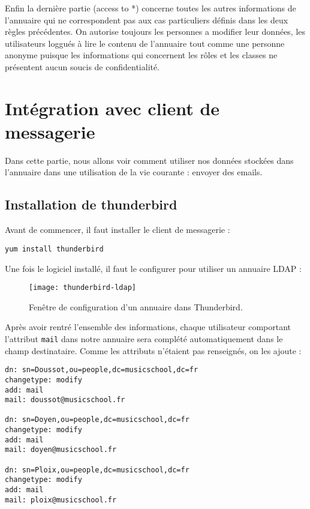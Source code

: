 \documentclass[12pt,a4paper,notitlepage]{article}
\begin{document}
Enfin la dernière partie (access to *) concerne toutes les autres informations de l'annuaire qui ne correspondent pas aux cas particuliers définis dans les deux règles précédentes. On autorise toujours les personnes a modifier leur données, les utilisateurs loggués à lire le contenu de l'annuaire tout comme une personne anonyme puisque les informations qui concernent les rôles et les classes ne présentent aucun soucis de confidentialité.





\clearpage
\section{Intégration avec client de messagerie}

Dans cette partie, nous allons voir comment utiliser nos données stockées dans l'annuaire dans une utilisation de la vie courante : envoyer des emails.
\subsection{Installation de thunderbird}

Avant de commencer, il faut installer le client de messagerie :
\begin{verbatim}
yum install thunderbird
\end{verbatim}

\bigskip

Une fois le logiciel installé, il faut le configurer pour utiliser un annuaire LDAP :

\begin{figure}[!h]
\begin{center}
\texttt{[image: thunderbird-ldap]}
\caption{Fenêtre de configuration d'un annuaire dans Thunderbird.}
\label{fig:da}
\end{center}
\end{figure}

Après avoir rentré l'ensemble des informations, chaque utilisateur comportant l'attribut \texttt{mail} dans notre annuaire sera complété automatiquement dans le champ destinataire. Comme les attributs n'étaient pas renseignés, on les ajoute :\\

\begin{lstlisting}[title=ajout-mail.ldif]
dn: sn=Doussot,ou=people,dc=musicschool,dc=fr
changetype: modify
add: mail
mail: doussot@musicschool.fr

dn: sn=Doyen,ou=people,dc=musicschool,dc=fr
changetype: modify
add: mail
mail: doyen@musicschool.fr

dn: sn=Ploix,ou=people,dc=musicschool,dc=fr
changetype: modify
add: mail
mail: ploix@musicschool.fr
\end{lstlisting}
\end{document}
